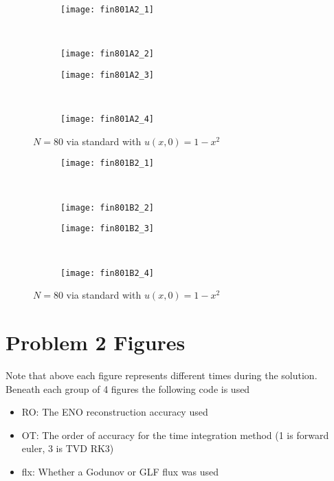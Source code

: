 \documentclass[10pt,letterpaper,fleqn]{article}
\begin{document}
\begin{figure}[h!]
        \centering
        \begin{subfigure}[b]{0.4\textwidth}
                \texttt{[image: fin801A2\_1]}
        \end{subfigure}%
        ~ 
        \begin{subfigure}[b]{0.4\textwidth}
                \texttt{[image: fin801A2\_2]}
        \end{subfigure}
        
        \begin{subfigure}[b]{0.4\textwidth}
                \texttt{[image: fin801A2\_3]}
        \end{subfigure}
        ~
        \begin{subfigure}[b]{0.4\textwidth}
                \texttt{[image: fin801A2\_4]}
        \end{subfigure}
        \caption{$N = 80$ via standard with $u(x,0) = 1 - x^2$}
\end{figure}

\begin{figure}[h!]
        \centering
        \begin{subfigure}[b]{0.4\textwidth}
                \texttt{[image: fin801B2\_1]}
        \end{subfigure}%
        ~ 
        \begin{subfigure}[b]{0.4\textwidth}
                \texttt{[image: fin801B2\_2]}
        \end{subfigure}
        
        \begin{subfigure}[b]{0.4\textwidth}
                \texttt{[image: fin801B2\_3]}
        \end{subfigure}
        ~
        \begin{subfigure}[b]{0.4\textwidth}
                \texttt{[image: fin801B2\_4]}
        \end{subfigure}
        \caption{$N = 80$ via standard with $u(x,0) = 1 - x^2$}
\end{figure}

\section{Problem 2 Figures}\label{app:FVM}
Note that above each figure represents different times during the solution.
Beneath each group of 4 figures the following code is used
\begin{itemize}
	\item RO: The ENO reconstruction accuracy used
	\item OT: The order of accuracy for the time integration method (1 is forward euler, 3 is TVD RK3)
	\item flx: Whether a Godunov or GLF flux was used 
\end{itemize}
\end{document}

